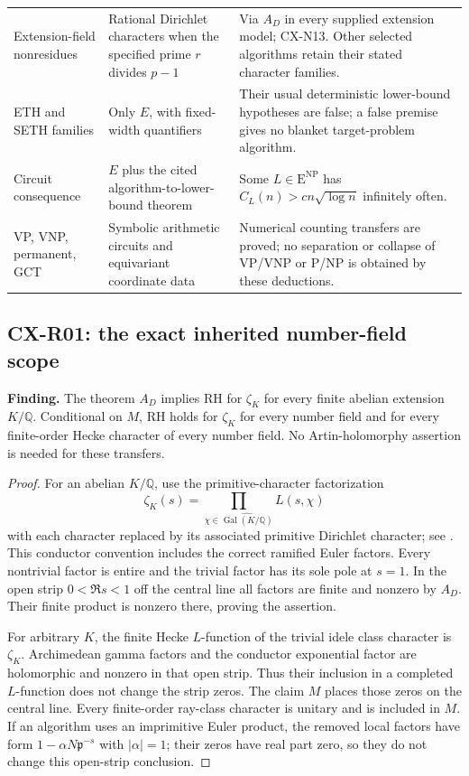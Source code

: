 \begin{longtable}{@{}p{}p{}p{}@{}}
Extension-field nonresidues & Rational Dirichlet characters when the specified prime $r$ divides $p-1$ & Via $A_D$ in every supplied extension model; CX-N13. Other selected algorithms retain their stated character families.\\
ETH and SETH families & Only $E$, with fixed-width quantifiers & Their usual deterministic lower-bound hypotheses are false; a false premise gives no blanket target-problem algorithm.\\
Circuit consequence & $E$ plus the cited algorithm-to-lower-bound theorem & Some $L\in\mathrm E^{\mathrm{NP}}$ has $C_L(n)>c n\sqrt{\log n}$ infinitely often.\\
VP, VNP, permanent, GCT & Symbolic arithmetic circuits and equivariant coordinate data & Numerical counting transfers are proved; no separation or collapse of VP/VNP or P/NP is obtained by these deductions.\\
\bottomrule
\end{longtable}

\subsection{CX-R01: the exact inherited number-field scope}
\label{finding:R01}

\textbf{Finding.} The theorem $A_D$ implies RH for $\zeta_K$ for every finite
abelian extension $K/\mathbb Q$.  Conditional on $M$, RH holds for $\zeta_K$
for every number field and for every finite-order Hecke character of every
number field.  No Artin-holomorphy assertion is needed for these transfers.

\begin{proof}
For an abelian $K/\mathbb Q$, use the primitive-character factorization
\[
 \zeta_K(s)=\prod_{\chi\in\widehat{\operatorname{Gal}(K/\mathbb Q)}}L(s,\chi)
\]
with each character replaced by its associated primitive Dirichlet character;
see \cite[Theorem~4.3, p.~33]{Washington1997}.  This conductor convention
includes the correct ramified Euler factors.  Every nontrivial factor is
entire and the trivial factor has its sole pole at $s=1$.  In the open strip
$0<\Re s<1$ off the central line all factors are finite and nonzero by $A_D$.
Their finite product is nonzero there, proving the assertion.

For arbitrary $K$, the finite Hecke $L$-function of the trivial idele class
character is $\zeta_K$.  Archimedean gamma factors and the conductor
exponential factor are holomorphic and nonzero in that open strip.  Thus
their inclusion in a completed $L$-function does not change the strip zeros.
The claim $M$ places those zeros on the central line.  Every finite-order
ray-class character is unitary and is included in $M$.  If an algorithm uses
an imprimitive Euler product, the removed local factors have form
$1-\alpha N\mathfrak p^{-s}$ with $|\alpha|=1$; their zeros have real part
zero, so they do not change this open-strip conclusion.
\end{proof}

